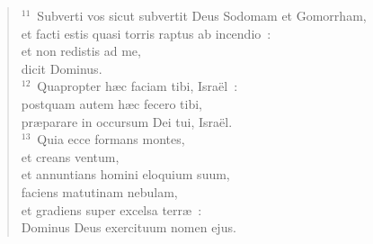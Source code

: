 \begin{verse}
${}^{11}$~Subverti vos sicut subvertit Deus Sodomam et Gomorrham,\\ et facti estis quasi torris raptus ab incendio~:\\ et non redistis ad me,\\ dicit Dominus.\\
${}^{12}$~Quapropter h\ae c faciam tibi, Isra\"el~:\\ postquam autem h\ae c fecero tibi,\\ pr\ae parare in occursum Dei tui, Isra\"el.\\
${}^{13}$~Quia ecce formans montes,\\ et creans ventum,\\ et annuntians homini eloquium suum,\\ faciens matutinam nebulam,\\ et gradiens super excelsa terr\ae~:\\ Dominus Deus exercituum nomen ejus.\end{verse}


